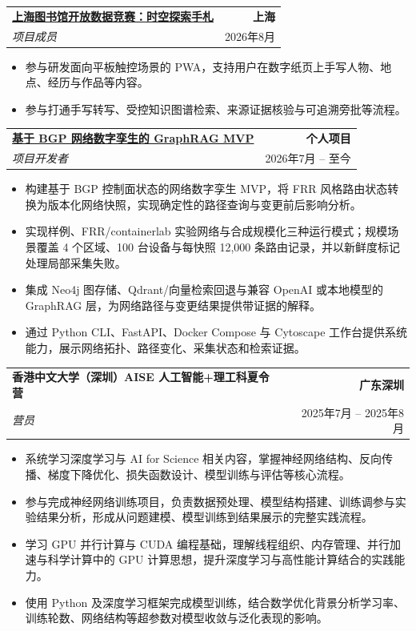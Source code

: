 \documentclass[letterpaper,11pt]{ctexart}
\makeatletter
\newcommand{\resumeProject}[4]{
    \vspace{3pt}
    \noindent
    \begin{tabular*}{\textwidth}{l@{\extracolsep{\fill}}r}
        \textbf{#1} & \textbf{#2} \\
        \textit{\textcolor{textgray}{#3}} & \textcolor{textgray}{#4} \\
    \end{tabular*}
    \vspace{-3pt}
}
\makeatother
\begin{document}
\resumeProject
{\href{https://github.com/Romanrose/shangtu-notebook}{上海图书馆开放数据竞赛：时空探索手札}}
{上海}
{项目成员}
{2026年8月}
\begin{itemize}
  \item 参与研发面向平板触控场景的 PWA，支持用户在数字纸页上手写人物、地点、经历与作品等内容。
  \item 参与打通手写转写、受控知识图谱检索、来源证据核验与可追溯旁批等流程。
\end{itemize}

\resumeProject
{\href{https://github.com/VincentXing23/Graphrag-for-Network/tree/main}{基于 BGP 网络数字孪生的 GraphRAG MVP}}
{个人项目}
{项目开发者}
{2026年7月 -- 至今}
\begin{itemize}
  \item 构建基于 BGP 控制面状态的网络数字孪生 MVP，将 FRR 风格路由状态转换为版本化网络快照，实现确定性的路径查询与变更前后影响分析。
  \item 实现样例、FRR/containerlab 实验网络与合成规模化三种运行模式；规模场景覆盖 4 个区域、100 台设备与每快照 12,000 条路由记录，并以新鲜度标记处理局部采集失败。
  \item 集成 Neo4j 图存储、Qdrant/向量检索回退与兼容 OpenAI 或本地模型的 GraphRAG 层，为网络路径与变更结果提供带证据的解释。
  \item 通过 Python CLI、FastAPI、Docker Compose 与 Cytoscape 工作台提供系统能力，展示网络拓扑、路径变化、采集状态和检索证据。
\end{itemize}

\resumeProject
{香港中文大学（深圳）AISE 人工智能+理工科夏令营}
{广东深圳}
{营员}
{2025年7月 -- 2025年8月}
\begin{itemize}
  \item 系统学习深度学习与 AI for Science 相关内容，掌握神经网络结构、反向传播、梯度下降优化、损失函数设计、模型训练与评估等核心流程。
  \item 参与完成神经网络训练项目，负责数据预处理、模型结构搭建、训练调参与实验结果分析，形成从问题建模、模型训练到结果展示的完整实践流程。
  \item 学习 GPU 并行计算与 CUDA 编程基础，理解线程组织、内存管理、并行加速与科学计算中的 GPU 计算思想，提升深度学习与高性能计算结合的实践能力。
  \item 使用 Python 及深度学习框架完成模型训练，结合数学优化背景分析学习率、训练轮数、网络结构等超参数对模型收敛与泛化表现的影响。
\end{itemize}

\vspace{2pt}
\end{document}
